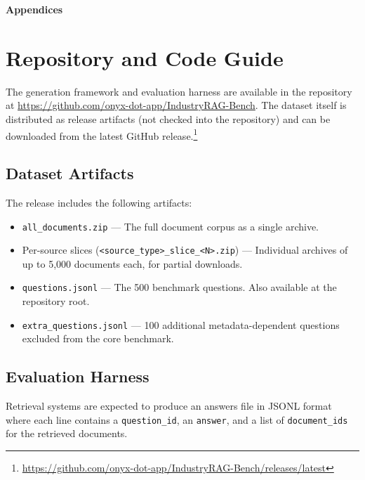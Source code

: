 \documentclass{article}
\begin{document}
\begin{center}
\Large\textbf{Appendices}
\end{center}
\vspace{1em}

\section{Repository and Code Guide}
\label{app:repo}

The generation framework and evaluation harness are available in the repository at \url{https://github.com/onyx-dot-app/IndustryRAG-Bench}. The dataset itself is distributed as release artifacts (not checked into the repository) and can be downloaded from the latest GitHub release.\footnote{\url{https://github.com/onyx-dot-app/IndustryRAG-Bench/releases/latest}}

\subsection{Dataset Artifacts}
\label{app:artifacts}

The release includes the following artifacts:

\begin{itemize}[leftmargin=2em]
  \item \texttt{all\_documents.zip} --- The full document corpus as a single archive.
  \item Per-source slices (\texttt{<source\_type>\_slice\_<N>.zip}) --- Individual archives of up to 5,000 documents each, for partial downloads.
  \item \texttt{questions.jsonl} --- The 500 benchmark questions. Also available at the repository root.
  \item \texttt{extra\_questions.jsonl} --- 100 additional metadata-dependent questions excluded from the core benchmark.
\end{itemize}

\subsection{Evaluation Harness}
\label{app:harness}

Retrieval systems are expected to produce an answers file in JSONL format where each line contains a \texttt{question\_id}, an \texttt{answer}, and a list of \texttt{document\_ids} for the retrieved documents.
\end{document}

